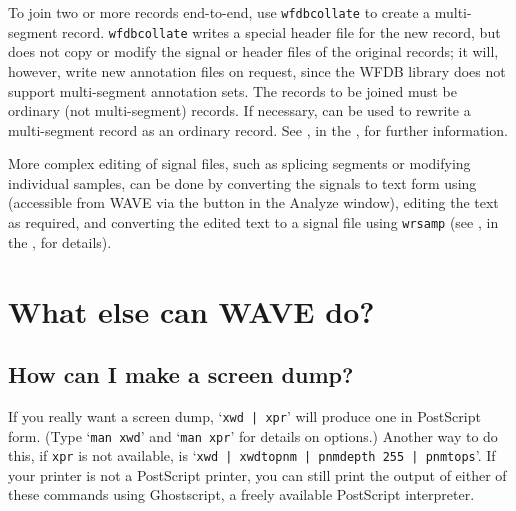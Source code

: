 \documentclass[twoside]{book}
\newcommand{\button}[1]{\cornersize{2}\ovalbox{\rule[-.3mm]{0cm}{2.5mm}\small\sf ~#1~}}
\newcommand{\WAVE}{{\sf WAVE}\xspace}
\begin{document}
To join two or more records end-to-end, use {\tt wfdbcollate} to create
a multi-segment record.  {\tt wfdbcollate} writes a special header file
for the new record, but does not copy or modify the signal
or header files of the original records;  it will, however, write
new annotation files on request, since the WFDB library does not support
multi-segment annotation sets.  The records to be joined must be
ordinary (not multi-segment) records.  If necessary,
can be used to rewrite a multi-segment record as an ordinary record.  See
, in the 
,
for further information.

More complex editing of signal files, such as splicing segments or
modifying individual samples, can be done by converting the signals to
text form using
(accessible from \WAVE{} via the
\button{List samples} button in the {\sf Analyze} window), editing the
text as required, and converting the edited text to a signal file
using {\tt wrsamp} (see
, in the
,
for details).

\section{What else can \WAVE{} do?}

\subsection{How can I make a screen dump?}

If you really want a screen dump, `{\tt xwd | xpr}' will produce one in
PostScript form.  (Type `{\tt man xwd}' and `{\tt man xpr}' for details
on options.)  Another way to do this, if {\tt xpr} is not available, is
`{\tt xwd | xwdtopnm | pnmdepth 255 | pnmtops}'.  If your printer is not a
PostScript printer, you can still print the output of either of these
commands using Ghostscript, a freely available PostScript interpreter.
\end{document}
